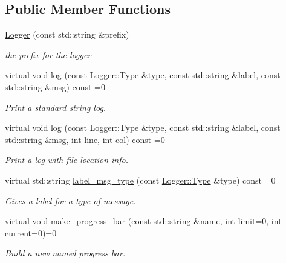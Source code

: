 \subsection*{Public Member Functions}
\begin{DoxyCompactItemize}
\item 
\mbox{\hyperlink{class_logger_a5eb8bf6f6a9111e62a7b2fee03ef7541}{Logger}} (const std\+::string \&prefix)
\begin{DoxyCompactList}\small\item\em the prefix for the logger \end{DoxyCompactList}\item 
virtual void \mbox{\hyperlink{class_logger_a124934c1b2661b229aca0493f7ec5f30}{log}} (const \mbox{\hyperlink{class_logger_acd39cb578d7a6750c959f2fad38d8db6}{Logger\+::\+Type}} \&type, const std\+::string \&label, const std\+::string \&msg) const =0
\begin{DoxyCompactList}\small\item\em Print a standard string log. \end{DoxyCompactList}\item 
virtual void \mbox{\hyperlink{class_logger_a9bdd18a8fb9cd19134b9ddf37f74b5bd}{log}} (const \mbox{\hyperlink{class_logger_acd39cb578d7a6750c959f2fad38d8db6}{Logger\+::\+Type}} \&type, const std\+::string \&label, const std\+::string \&msg, int line, int col) const =0
\begin{DoxyCompactList}\small\item\em Print a log with file location info. \end{DoxyCompactList}\item 
virtual std\+::string \mbox{\hyperlink{class_logger_abe4434e4ae0efd8b41cb2a61458a710d}{label\+\_\+msg\+\_\+type}} (const \mbox{\hyperlink{class_logger_acd39cb578d7a6750c959f2fad38d8db6}{Logger\+::\+Type}} \&type) const =0
\begin{DoxyCompactList}\small\item\em Gives a label for a type of message. \end{DoxyCompactList}\item 
\mbox{\label{class_logger_a3630b175aeeb23473b2740563e9422d5}} 
virtual void \mbox{\hyperlink{class_logger_a3630b175aeeb23473b2740563e9422d5}{make\+\_\+progress\+\_\+bar}} (const std\+::string \&name, int limit=0, int current=0)=0
\begin{DoxyCompactList}\small\item\em Build a new named progress bar. \end{DoxyCompactList}\item 

\end{DoxyCompactItemize}
